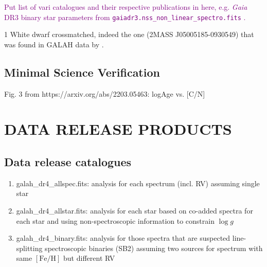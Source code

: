 \documentclass[
  journal=pasa,
  manuscript=research-paper, %
  year=2023,
  volume=37
]{cup-journal}
\newcommand{\SB}[1]{{\textcolor{purple}{#1}}}
\newcommand{\logg}{$\log g$\xspace}
\newcommand{\feh}{$\mathrm{[Fe/H]}$\xspace}
\newcommand{\Gaia}{\textit{Gaia}\xspace}
\begin{document}
\SB{Put list of vari catalogues and their respective publications in here, e.g. \Gaia DR3 binary star parameters from \texttt{gaiadr3.nss\_non\_linear\_spectro.fits} \citep{Halbwachs2023}.
}

1 White dwarf crossmatched, indeed the one (2MASS J05005185-0930549) that was found in GALAH data by \citet{Kawka2020}.

\subsection{Minimal Science Verification}

Fig. 3 from https://arxiv.org/abs/2203.05463: logAge vs. [C/N]

\section{DATA RELEASE PRODUCTS}
\label{sec:catalogues_release_products}

\subsection{Data release catalogues}
\label{sec:data_release_catalogues}

\begin{enumerate}
   \item galah\_dr4\_allspec.fits: analysis for each spectrum (incl. RV) assuming single star
   \item galah\_dr4\_allstar.fits: analysis for each star based on co-added spectra for each star and using non-spectroscopic information to constrain \logg
   \item galah\_dr4\_binary.fits: analysis for those spectra that are suspected line-splitting spectroscopic binaries (SB2) assuming two sources for spectrum with same \feh but different RV
\end{enumerate}
\end{document}
